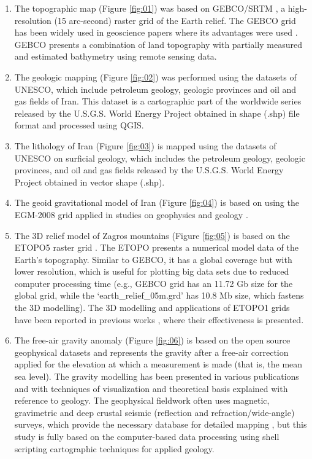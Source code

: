 \documentclass[12pt,a4paper,oneside]{article}
\begin{document}
\begin{enumerate}  
	\item The topographic map (Figure \ref{fig:01}) was based on GEBCO/SRTM \citep{GEBCO}, a high-resolution (15 arc-second) raster grid of the Earth relief. The GEBCO grid has been widely used in geoscience papers where its advantages were used \citep{Lemenkova2020c,Lemenkova2020d,Lemenkova202112,Lindh}. GEBCO presents a combination of land topography with partially measured and estimated bathymetry using remote sensing data. 
	\item The geologic mapping (Figure \ref{fig:02}) was performed using the datasets of UNESCO, which include petroleum geology, geologic provinces and oil and gas fields of Iran. This dataset is a cartographic part of the worldwide series released by the U.S.G.S. World Energy Project obtained in shape (.shp) file format and processed using QGIS.
	\item The lithology of Iran (Figure \ref{fig:03}) is mapped using the datasets of UNESCO on surficial geology, which includes the petroleum geology, geologic provinces, and oil and gas fields released by the U.S.G.S. World Energy Project obtained in vector shape (.shp).
	\item The geoid gravitational model of Iran (Figure \ref{fig:04}) is based on using the EGM-2008 grid \citep{Pavlis} applied in studies on geophysics and geology \citep{Lemenkova2020h}.
	\item The 3D relief model of Zagros mountains (Figure \ref{fig:05}) is based on the ETOPO5 raster grid \citep{AmanteEakins}. The ETOPO presents a numerical model data of the Earth’s topography. Similar to GEBCO, it has a global coverage but with lower resolution, which is useful for plotting big data sets due to reduced computer processing time (e.g., GEBCO grid has an 11.72 Gb size for the global grid, while the ‘earth\_relief\_05m.grd’ has 10.8 Mb size, which fastens the 3D modelling). The 3D modelling and applications of ETOPO1 grids have been reported in previous works \citep{Lemenkova2020e,Verard,Spooner,Lemenkova202017}, where their effectiveness is presented. 
	\item The free-air gravity anomaly (Figure \ref{fig:06}) is based on the open source geophysical datasets \citep{Sandwell1997,Sandwell2014} and represents the gravity after a free-air correction applied for the elevation at which a measurement is made (that is, the mean sea level). The gravity modelling has been presented in various publications \citep{Lemenkova2020i} and \citep{Djamour} with techniques of visualization and theoretical basis explained with reference to geology. The geophysical fieldwork often uses magnetic, gravimetric and deep crustal seismic (reflection and refraction/wide-angle) surveys, which provide the necessary database for detailed mapping \citep{Lemenkova202140,Lemenkova202135,Lemenkova202127}, but this study is fully based on the computer-based data processing using shell scripting cartographic techniques for applied geology.

\end{enumerate}
\end{document}

